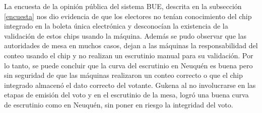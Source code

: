 La encuesta de la opinión pública del sistema BUE, descrita en la subsección \ref{encuesta} nos dio evidencia de que los electores no tenían conocimiento del chip integrado en la boleta única electrónica y desconocían la existencia de la validación de estos chips usando la máquina. 
Además se pudo observar que las autoridades de mesa en muchos casos, dejan a las máquinas la responsabilidad del conteo usando el chip y no realizan un escrutinio manual para su validación.
Por lo tanto, se puede concluir que la curva del escrutinio en Neuquén es buena pero sin seguridad de que las máquinas realizaron un conteo correcto o que el chip integrado almacenó el dato correcto del votante. Gukena al no involucrarse en las etapas de emisión del voto y en el escrutinio de la mesa, logró una buena curva de escrutinio como en Neuquén, sin poner en riesgo la integridad del voto. 
